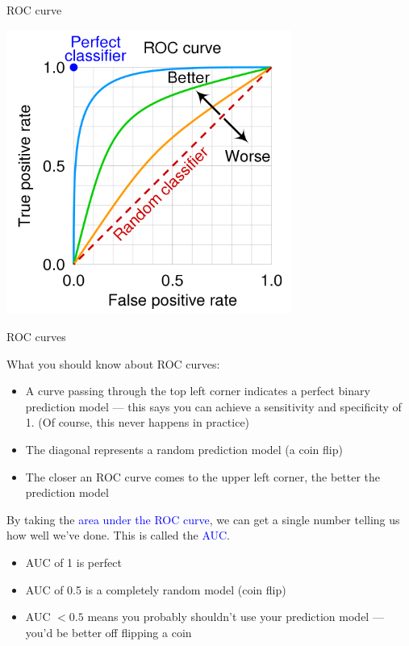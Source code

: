 \documentclass[10pt,t]{beamer}
\begin{document}
\begin{frame}{ROC curve}
	\vspace{-0.3cm}
	\begin{center}
	\includegraphics[width=0.7\textwidth]{./figs/roc_curve_example}
	\end{center}
\end{frame}

\begin{frame}{ROC curves}
	
	\vspace{-5 mm}
	
	What you should know about ROC curves:
	
	\medskip
	\begin{itemize}
		\item A curve passing through the top left corner indicates a perfect binary prediction model --- this says you can achieve a sensitivity and specificity of 1. (Of course, this never happens in practice) 
		
		\medskip
		 
		\item The diagonal represents a random prediction model (a coin flip)  
		
		\medskip
		
		\item The closer an ROC curve comes to the upper left corner, the better the prediction model
	\end{itemize}

\medskip

	By taking the \textcolor{blue}{area under the ROC curve}, we can get a single number telling us how well we've done. This is called the \textcolor{blue}{AUC}.  
	
	\medskip
	
	\begin{itemize}
		\item AUC of 1 is perfect 
		
		\smallskip
		\item AUC of 0.5 is a completely random model (coin flip)
		
		\medskip
		
		\item AUC $<0.5$ means you probably shouldn't use your prediction model --- you'd be better off flipping a coin
	\end{itemize}
\end{frame}
\end{document}
